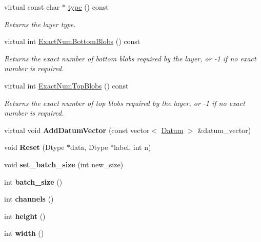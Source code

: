 \begin{DoxyCompactItemize}
virtual const char $\ast$ \mbox{\hyperlink{classcaffe_1_1_memory_data_layer_a374835f9df814ef78e3f4a4d640f0d35}{type}} () const
\begin{DoxyCompactList}\small\item\em Returns the layer type. \end{DoxyCompactList}\item 
virtual int \mbox{\hyperlink{classcaffe_1_1_memory_data_layer_a05a867526de7e0c6ec4851a97f52a47b}{Exact\+Num\+Bottom\+Blobs}} () const
\begin{DoxyCompactList}\small\item\em Returns the exact number of bottom blobs required by the layer, or -\/1 if no exact number is required. \end{DoxyCompactList}\item 
virtual int \mbox{\hyperlink{classcaffe_1_1_memory_data_layer_af714b4cbc022be1592ad26c300b63ae4}{Exact\+Num\+Top\+Blobs}} () const
\begin{DoxyCompactList}\small\item\em Returns the exact number of top blobs required by the layer, or -\/1 if no exact number is required. \end{DoxyCompactList}\item 
\mbox{\label{classcaffe_1_1_memory_data_layer_acb40a0aae033ba50115edc42db3d08fe}} 
virtual void {\bfseries Add\+Datum\+Vector} (const vector$<$ \mbox{\hyperlink{classcaffe_1_1_datum}{Datum}} $>$ \&datum\+\_\+vector)
\item 
\mbox{\label{classcaffe_1_1_memory_data_layer_aeaa745c4fe3a957b973bf94dca6a5f2b}} 
void {\bfseries Reset} (Dtype $\ast$data, Dtype $\ast$label, int n)
\item 
\mbox{\label{classcaffe_1_1_memory_data_layer_a07bc96b979032d11a0bf00fad6a3f1ff}} 
void {\bfseries set\+\_\+batch\+\_\+size} (int new\+\_\+size)
\item 
\mbox{\label{classcaffe_1_1_memory_data_layer_a06bfb6d06f61db11699a6b3ce7b1ee53}} 
int {\bfseries batch\+\_\+size} ()
\item 
\mbox{\label{classcaffe_1_1_memory_data_layer_aeeed090aee729e61426525c6a62f79a2}} 
int {\bfseries channels} ()
\item 
\mbox{\label{classcaffe_1_1_memory_data_layer_a13775655bc0563ec85f124604ebb945f}} 
int {\bfseries height} ()
\item 
\mbox{\label{classcaffe_1_1_memory_data_layer_a2c8b2f60895130d3ebfdc775724b5503}} 
int {\bfseries width} ()
\end{DoxyCompactItemize}
